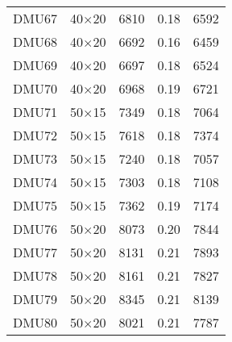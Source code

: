 \begin{table}[H]
\begin{tabular}{@{}ccccc@{}}
DMU67 & 40$\times$20 & 6810 & 0.18 & 6592\\ 
DMU68 & 40$\times$20 & 6692 & 0.16 & 6459\\ 
DMU69 & 40$\times$20 & 6697 & 0.18 & 6524\\ 
DMU70 & 40$\times$20 & 6968 & 0.19 & 6721\\ 
DMU71 & 50$\times$15 & 7349 & 0.18 & 7064\\ 
DMU72 & 50$\times$15 & 7618 & 0.18 & 7374\\ 
DMU73 & 50$\times$15 & 7240 & 0.18 & 7057\\ 
DMU74 & 50$\times$15 & 7303 & 0.18 & 7108\\ 
DMU75 & 50$\times$15 & 7362 & 0.19 & 7174\\ 
DMU76 & 50$\times$20 & 8073 & 0.20 & 7844\\ 
DMU77 & 50$\times$20 & 8131 & 0.21 & 7893\\ 
DMU78 & 50$\times$20 & 8161 & 0.21 & 7827\\ 
DMU79 & 50$\times$20 & 8345 & 0.21 & 8139\\ 
DMU80 & 50$\times$20 & 8021 & 0.21 & 7787\\ \bottomrule
\end{tabular}
\end{table}
